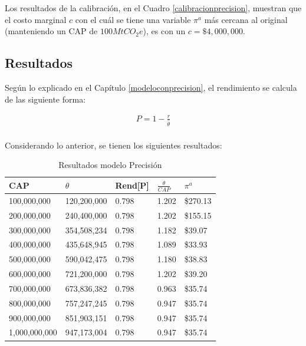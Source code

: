 Los resultados de la calibración, en el Cuadro \ref{calibracionprecision}, muestran que el costo marginal $c$ con el cuál se tiene una variable $\pi^a$ más cercana al original (manteniendo un CAP de $100MtCO_{2}e$), es con un $c=\$4,000,000$.

\subsection{Resultados}

Según lo explicado en el Capítulo \ref{modeloconprecision}, el rendimiento se calcula de las siguiente forma: 
\vspace{2.5mm}

\begin{equation}
\begin{array}{rrclcl}
\displaystyle P = 1- \frac{r}{\hat{\theta}} \\
\end{array}
\end{equation}

Considerando lo anterior, se tienen los siguientes resultados:

\begin{table}[H]
    \centering
    \begin{tabular}{|l|l|l|l|l|}
    \hline
        CAP & $\theta$ & Rend[P] & $\frac{\theta}{CAP}$  & $\pi^a$ \\ \hline
        100,000,000 & 120,200,000  & 0.798  & 1.202  &  \$270.13   \\ \hline
        200,000,000 & 240,400,000  & 0.798  & 1.202  &  \$155.15   \\ \hline
        300,000,000 & 354,508,234  & 0.798  & 1.182  &  \$39.07   \\ \hline
        400,000,000 & 435,648,945  & 0.798  & 1.089  &  \$33.93   \\ \hline
        500,000,000 & 590,042,475  & 0.798  & 1.180  &  \$38.83   \\ \hline
        600,000,000 & 721,200,000  & 0.798  & 1.202  &  \$39.20   \\ \hline
        700,000,000 & 673,836,382  & 0.798  & 0.963  &  \$35.74   \\ \hline
        800,000,000 & 757,247,245  & 0.798  & 0.947  &  \$35.74   \\ \hline
        900,000,000 & 851,903,151  & 0.798  & 0.947  &  \$35.74   \\ \hline
        1,000,000,000 & 947,173,004  & 0.798  & 0.947  &  \$35.74   \\ \hline
    \end{tabular}
    \caption{{\footnotesize Resultados modelo Precisión}}
    \label{resultadosprecision}
\end{table}

